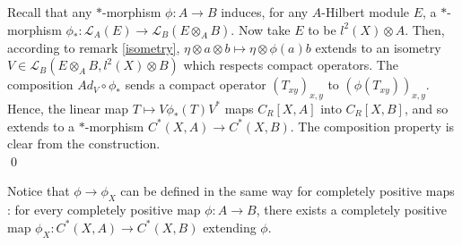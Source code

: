\begin{dem}
Recall that any $*$-morphism $\phi : A\rightarrow B$ induces, for any $A$-Hilbert module $E$, a $*$-morphism $\phi_* : \mathcal L_A(E)\rightarrow \mathcal L_B(E\otimes_A B)$. Now take $E$ to be $l^2(X)\otimes A$. Then, according to remark \ref{isometry}, $\eta\otimes a\otimes b\mapsto \eta \otimes\phi(a) b $ extends to an isometry $V\in \mathcal L_B(E\otimes_A B,l^2(X)\otimes B)$ which respects compact operators. The composition $Ad_V\circ\phi_*$ sends a compact operator $(T_{xy})_{x,y}$ to $(\phi(T_{xy}))_{x,y}$.\\

Hence, the linear map $T \mapsto V\phi_*(T)V^*$ maps $C_R[X,A]$ into $C_R[X,B]$, and so extends to a $*$-morphism $C^*(X,A)\rightarrow C^*(X,B)$. The composition property is clear from the construction.\\
\qed
\end{dem}

\begin{rk}
Notice that $\phi\rightarrow \phi_X$ can be defined in the same way for completely positive maps : for every completely positive map $\phi: A \rightarrow B$, there exists a completely positive map $\phi_X : C^*(X,A)\rightarrow C^*(X,B)$ extending $\phi$.
\end{rk}


